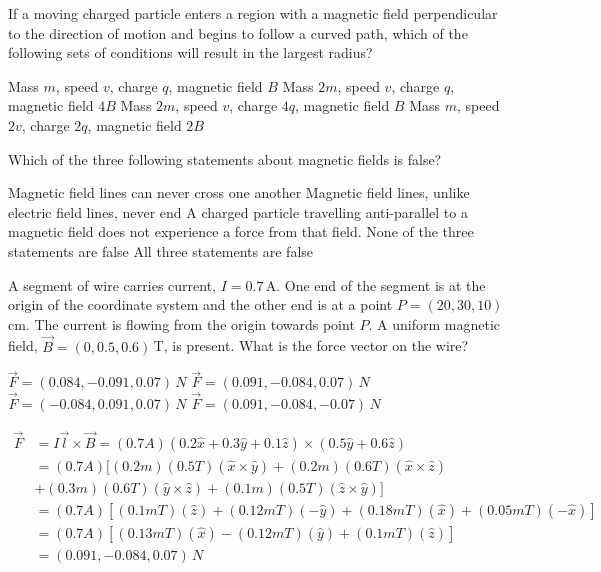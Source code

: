 \question If a moving charged particle enters a region with a magnetic field perpendicular to the direction of motion and begins to follow a curved path, which of the following sets of conditions will result in the largest radius?
\begin{checkboxes}
\CorrectChoice Mass $m$, speed $v$, charge $q$, magnetic field $B$ \correct
\choice Mass $2m$, speed $v$, charge $q$, magnetic field $4B$
\choice Mass $2m$, speed $v$, charge $4q$, magnetic field $B$
\choice Mass $m$, speed $2v$, charge $2q$, magnetic field $2B$
\end{checkboxes}

\question Which of the three following statements about magnetic fields is false?
\begin{checkboxes}
\choice Magnetic field lines can never cross one another
\choice Magnetic field lines, unlike electric field lines, never end
\choice A charged particle travelling anti-parallel to a magnetic field does not experience a force from that field.
\CorrectChoice None of the three statements are false \correct
\choice All three statements are false
\end{checkboxes}

\question A segment of wire carries current, $I=0.7$\,A. One end of the segment is at the origin of the coordinate system and the other end is at a point $P=(20,30,10)$\,cm. The current is flowing from the origin towards point $P$. A uniform magnetic field, $\vec B=(0,0.5,0.6)$\,T, is present. What is the force vector on the wire? 
\begin{checkboxes}
\choice $\vec F=(0.084, -0.091, 0.07)\,N$
\CorrectChoice $\vec F=(0.091, -0.084, 0.07)\,N$ \correct
\choice $\vec F=(-0.084, 0.091, 0.07)\,N$
\choice $\vec F=(0.091, -0.084, -0.07)\,N$
\end{checkboxes}
\begin{solution}
\begin{align*}
\vec F&= I \vec l \times \vec B=(0.7A) (0.2\hat x+0.3\hat y+0.1\hat z)\times (0.5 \hat y+0.6 \hat z)\\
      &= (0.7A) [ (0.2m)(0.5T)(\hat x \times \hat y)+ (0.2m)(0.6T) (\hat x \times \hat z)\\
      &+ (0.3m)(0.6T) (\hat y\times \hat z) +(0.1m)(0.5T)(\hat z \times \hat y) ]\\
      &=(0.7A) [ (0.1mT)(\hat z)+ (0.12mT) (-\hat y)+ (0.18mT) (\hat x) +(0.05mT)(-\hat x) ]\\
      &=(0.7A) [ (0.13mT) (\hat x) - (0.12mT) (\hat y) +(0.1mT)(\hat z) ]   \\
      &=(0.091, -0.084, 0.07)\,N 
\end{align*}
\end{solution}

